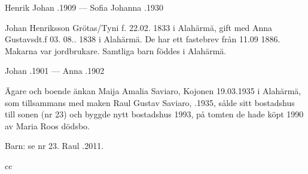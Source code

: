 Henrik Johan .1909  ---  Sofia Johanna .1930


%
Johan Henriksson  Grötas/Tyni f. 22.02. 1833 i Alahärmä, gift med Anna Gustavsdt.f 03. 08.. 1838 i Alahärmä. De har ett fastebrev från 11.09 1886. Makarna var jordbrukare. Samtliga barn föddes i Alahärmä.
\begin{jhchildren}
  \item {}
  \item {}
  \item {}
  \item {}
  \item {}
  \item {}
  \item {}
  \item {}
\end{jhchildren}

Johan .1901  ---  Anna .1902



%



%
Ägare och boende änkan Maija Amalia Saviaro, \textborn Kojonen 19.03.1935 i Alahärmä, som tillsammans med maken Raul Gustav Saviaro, .1935, sålde sitt bostadshus till sonen (nr 23) och byggde nytt bostadshus 1993, på tomten de hade köpt 1990 av Maria Roos dödsbo.

Barn: se nr 23. Raul .2011.

cc%




%



